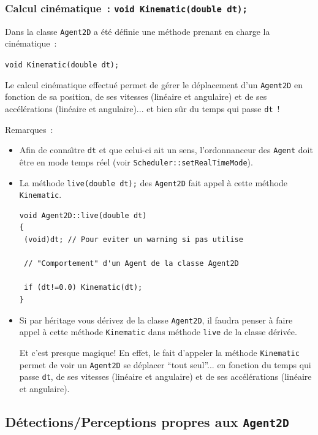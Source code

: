 \documentclass[12pt]{article}
\begin{document}
\subsubsection{Calcul cin\'ematique~: {\tt void Kinematic(double dt);}}

Dans la classe {\tt Agent2D} a \'et\'e d\'efinie une m\'ethode
prenant en charge la cin\'ematique~:

\begin{center}
{\tt void Kinematic(double dt);}
\end{center}

Le calcul cin\'ematique effectu\'e permet de g\'erer le d\'eplacement
d'un {\tt Agent2D} en fonction de sa position, de ses vitesses
(lin\'eaire et angulaire) et de ses acc\'el\'erations (lin\'eaire et
angulaire)... et bien s\^ur du temps qui passe {\tt dt}~!

\vspace{0.3cm}
Remarques~:
\begin{itemize}
\item Afin de conna\^ \i tre {\tt dt} et que celui-ci ait un sens,
l'ordonnanceur des {\tt Agent} doit \^etre en mode temps r\'eel
(voir {\tt Scheduler::setRealTimeMode}).
\item La m\'ethode {\tt live(double dt);} des {\tt Agent2D} fait
appel \`a cette m\'ethode {\tt Kinematic}.

\begin{small}
\begin{verbatim}
void Agent2D::live(double dt)
{
 (void)dt; // Pour eviter un warning si pas utilise

 // "Comportement" d'un Agent de la classe Agent2D

 if (dt!=0.0) Kinematic(dt);
}
\end{verbatim}
\end{small}

\item Si par h\'eritage vous d\'erivez de la classe {\tt Agent2D},
il faudra penser \`a faire appel \`a cette m\'ethode {\tt Kinematic}
dans m\'ethode {\tt live} de la classe d\'eriv\'ee.

Et c'est presque magique!
En effet, le fait d'appeler la m\'ethode {\tt Kinematic} permet de voir
un {\tt Agent2D} se d\'eplacer ``tout seul''... en fonction du temps qui
passe {\tt dt}, de ses vitesses (lin\'eaire et angulaire) et
de ses acc\'el\'erations (lin\'eaire et angulaire).
\end{itemize}


\subsection{D\'etections/Perceptions propres aux {\tt Agent2D}}
\end{document}
